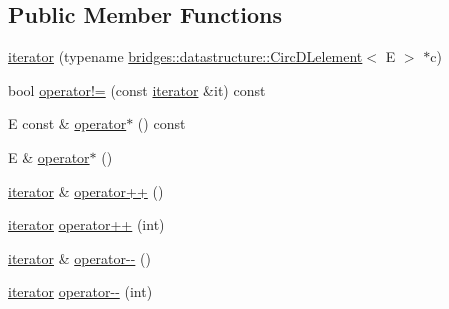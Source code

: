 \subsection*{Public Member Functions}
\begin{DoxyCompactItemize}
\item 
\hyperlink{classbridges_1_1datastructure_1_1_circ_d_lelement_1_1_circ_d_lelement__listhelper_1_1iterator_af584c96d1a02d138a7db83815cee6428}{iterator} (typename \hyperlink{classbridges_1_1datastructure_1_1_circ_d_lelement}{bridges\+::datastructure\+::\+Circ\+D\+Lelement}$<$ E $>$ $\ast$c)
\item 
bool \hyperlink{classbridges_1_1datastructure_1_1_circ_d_lelement_1_1_circ_d_lelement__listhelper_1_1iterator_a2739037e24a59ec4e8e69871451d43cf}{operator!=} (const \hyperlink{classbridges_1_1datastructure_1_1_circ_d_lelement_1_1_circ_d_lelement__listhelper_1_1iterator}{iterator} \&it) const
\item 
E const  \& \hyperlink{classbridges_1_1datastructure_1_1_circ_d_lelement_1_1_circ_d_lelement__listhelper_1_1iterator_a66bc18d767802d2dc172f5eb1ebb1a6e}{operator$\ast$} () const
\item 
E \& \hyperlink{classbridges_1_1datastructure_1_1_circ_d_lelement_1_1_circ_d_lelement__listhelper_1_1iterator_ad850d592029ecbb8e95c2e9e2fafe861}{operator$\ast$} ()
\item 
\hyperlink{classbridges_1_1datastructure_1_1_circ_d_lelement_1_1_circ_d_lelement__listhelper_1_1iterator}{iterator} \& \hyperlink{classbridges_1_1datastructure_1_1_circ_d_lelement_1_1_circ_d_lelement__listhelper_1_1iterator_aabfb538351c45de78af080249d014d47}{operator++} ()
\item 
\hyperlink{classbridges_1_1datastructure_1_1_circ_d_lelement_1_1_circ_d_lelement__listhelper_1_1iterator}{iterator} \hyperlink{classbridges_1_1datastructure_1_1_circ_d_lelement_1_1_circ_d_lelement__listhelper_1_1iterator_a02438c2e20111e85b053b2150f26bbf9}{operator++} (int)
\item 
\hyperlink{classbridges_1_1datastructure_1_1_circ_d_lelement_1_1_circ_d_lelement__listhelper_1_1iterator}{iterator} \& \hyperlink{classbridges_1_1datastructure_1_1_circ_d_lelement_1_1_circ_d_lelement__listhelper_1_1iterator_a88ebb96d0376f289b8520c33a77f1269}{operator-\/-\/} ()
\item 
\hyperlink{classbridges_1_1datastructure_1_1_circ_d_lelement_1_1_circ_d_lelement__listhelper_1_1iterator}{iterator} \hyperlink{classbridges_1_1datastructure_1_1_circ_d_lelement_1_1_circ_d_lelement__listhelper_1_1iterator_aa92dbdc5af7168113518f5c1d4eeb91c}{operator-\/-\/} (int)
\end{DoxyCompactItemize}



